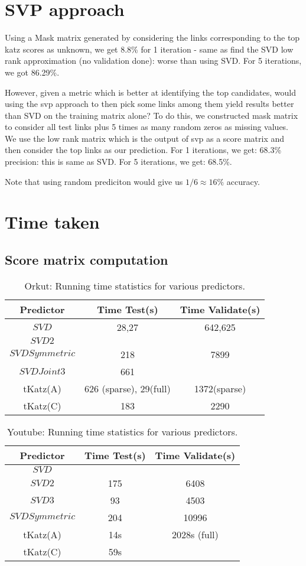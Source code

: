 \documentclass{report}
\begin{document}
\section{SVP approach}
Using a Mask matrix generated by considering the links corresponding to the top katz scores as unknown, we get 8.8\% for 1 iteration - same as find the SVD low rank approximation (no validation done): worse than using SVD. For 5 iterations, we got 86.29\%.

However, given a metric which is better at identifying the top candidates, would using the svp approach to then pick some links among them yield results better than SVD on the training matrix alone? To do this, we constructed mask matrix to consider all test links plus 5 times as many random zeros as missing values. We use the low rank matrix which is the output of svp as a score matrix and then consider the top links as our prediction. For 1 iterations, we get: 68.3\% precision: this is same as SVD. For 5 iterations, we get: 68.5\%.

Note that using random prediciton would give us $1/6 \approx 16\%$ accuracy.

\section{Time taken}
\subsection{Score matrix computation}
\begin{table*}
\centering
\begin{tabular}{| c | c | c |} \hline
Predictor&Time Test(s)&Time Validate(s)\\ \hline
$SVD$ & 28,27 & 642,625 \\ \hline
$SVD2$ &  &  \\ \hline
$SVDSymmetric$ & 218 & 7899 \\ \hline
$SVDJoint3$ & 661 & \\ \hline
tKatz(A) & 626 (sparse), 29(full) & 1372(sparse) \\ \hline
tKatz(C) & 183 & 2290 \\ \hline
\end{tabular}
\caption{Orkut: Running time statistics for various predictors.}
\end{table*}

\begin{table*}
\centering
\begin{tabular}{| c | c | c |} \hline
Predictor&Time Test(s)&Time Validate(s)\\ \hline
$SVD$ & & \\ \hline
$SVD2$ & 175 & 6408 \\ \hline
$SVD3$ &  93 & 4503 \\ \hline
$SVDSymmetric$ & 204 & 10996 \\ \hline
tKatz(A) & 14s & 2028s (full) \\ \hline
tKatz(C) & 59s & \\ \hline
\end{tabular}
\caption{Youtube: Running time statistics for various predictors.}
\end{table*}
\end{document}
